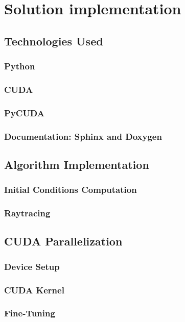 \chapter{Solution implementation}

\section{Technologies Used}
\subsection{Python}
\subsection{CUDA}
\subsection{PyCUDA}
\subsection{Documentation: Sphinx and Doxygen}

\section{Algorithm Implementation}
\subsection{Initial Conditions Computation}
\subsection{Raytracing}

\section{CUDA Parallelization}
\subsection{Device Setup}
\subsection{CUDA Kernel}
\subsection{Fine-Tuning}